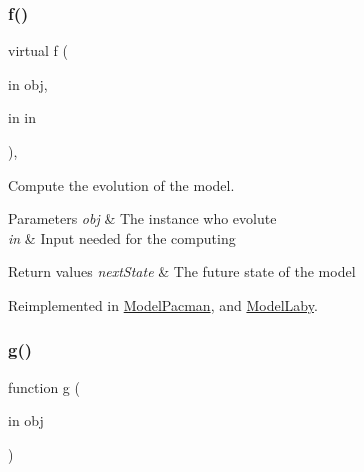 \mbox{\label{class_model_s_e_d_ac36f9451c43b120828af4380858f2024}} 
\subsubsection{\texorpdfstring{f()}{f()}\hspace{0.1cm}{\footnotesize\ttfamily [2/2]}}
{\footnotesize\ttfamily virtual f (\begin{DoxyParamCaption}\item[{in}]{obj,  }\item[{in}]{in }\end{DoxyParamCaption})\hspace{0.3cm}{\ttfamily [virtual]}, {\ttfamily [inherited]}}



Compute the evolution of the model. 


\begin{DoxyParams}{Parameters}
{\em obj} & The instance who evolute \\
\hline
{\em in} & Input needed for the computing \\
\hline
\end{DoxyParams}

\begin{DoxyRetVals}{Return values}
{\em next\+State} & The future state of the model \\
\hline
\end{DoxyRetVals}


Reimplemented in \hyperlink{class_model_pacman_a6f3b146c92a207e95690d08975e1e072}{Model\+Pacman}, and \hyperlink{class_model_laby_a6f3b146c92a207e95690d08975e1e072}{Model\+Laby}.

\mbox{\label{class_stop_condition_a07dadfabe92bf9a144b8a862720e7746}} 
\subsubsection{\texorpdfstring{g()}{g()}}
{\footnotesize\ttfamily function g (\begin{DoxyParamCaption}\item[{in}]{obj }\end{DoxyParamCaption})\hspace{0.3cm}{\ttfamily [virtual]}}




